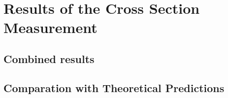 \chapter{Results of the Cross Section Measurement}

\section{Combined results}

\section{Comparation with Theoretical Predictions}